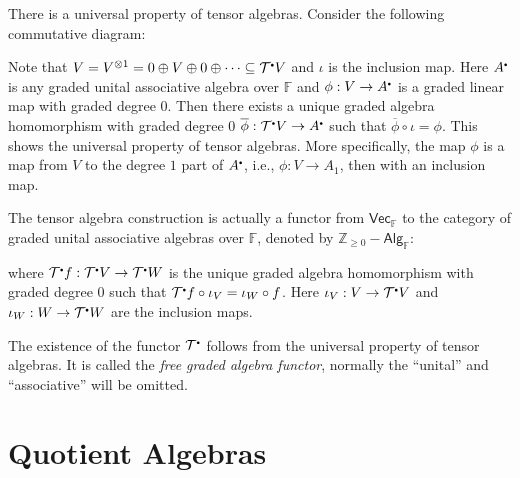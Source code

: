 \documentclass[
	11pt, %
	fleqn, %
	a4paper, %
]{LegrandOrangeBook}
\newcommand{\smallbullet}{\scalebox{0.5}{$\bullet$}}
\renewcommand{\bar}[1]{\overline{#1}} %
\newcommand{\F}{\mathbb{F}} %
\newcommand{\Vect}{\boldsymbol{\mathsf{Vec}}} %
\newcommand{\T}{\mathcal{T}^{\smallbullet}} %
\newcommand{\Z}{\mathbb{Z}} %
\newcommand{\Alg}{\boldsymbol{\mathsf{Alg}}} %
\begin{document}
There is a universal property of tensor algebras. Consider the following commutative diagram:
\begin{center}
\end{center}
Note that $V = V^{\otimes 1} = 0 \oplus V \oplus 0 \oplus \cdots \subseteq \T V$ and $\iota$ is the inclusion map. Here $A^{\smallbullet}$ is any graded unital associative algebra over $\F$ and $\phi : V \to A^{\smallbullet}$ is a graded linear map with graded degree $0$. Then there exists a unique graded algebra homomorphism with graded degree $0$ $\bar{\phi} : \T V \to A^{\smallbullet}$ such that $\bar{\phi} \circ \iota = \phi$. This shows the universal property of tensor algebras. More specifically, the map $\phi$ is a map from $V$ to the degree $1$ part of $A^{\smallbullet}$, i.e., $\phi : V \to A_1$, then with an inclusion map.

The tensor algebra construction is actually a functor from $\Vect_{\F}$ to the category of graded unital associative algebras over $\F$, denoted by $\Z_{\geq 0} - \Alg_{\F}$:
\begin{center}
\end{center}
where $\T f : \T V \to \T W$ is the unique graded algebra homomorphism with graded degree $0$ such that $\T f \circ \iota_V = \iota_W \circ f$. Here $\iota_V : V \to \T V$ and $\iota_W : W \to \T W$ are the inclusion maps. 

The existence of the functor $\T$ follows from the universal property of tensor algebras. It is called the \emph{free graded algebra functor}, normally the ``unital'' and ``associative'' will be omitted.

\newpage

\section{Quotient Algebras}
\end{document}
